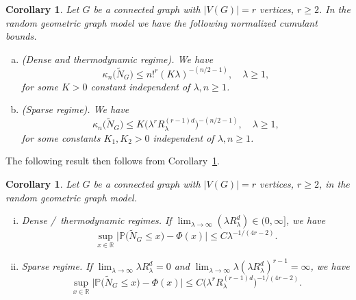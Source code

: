 \documentclass[12pt]{article}
\newtheorem{corollary}[prop]{Corollary}
\def\real{{\mathord{\mathbb R}}}
\def\P{\mathbb{P}}
\numberwithin{equation}{section}
\begin{document}
\begin{corollary}
    \label{thm8-0}
 Let $G$ be a connected graph with $|V(G)|=r$ vertices, $r\geq 2$.
 In the random geometric graph model we have the following
 normalized cumulant bounds.  
 \begin{enumerate}[a)]
 \item (Dense and thermodynamic regime). 
   We have
   \begin{equation}
     \kappa_n\big(\widetilde{N}_G\big) \leq n!^r ( K \lambda )^{-(n/2-1)}, 
     \quad \lambda \geq 1,
   \end{equation}
for some $K>0$ constant independent of $\lambda , n\geq 1$. 
  \item (Sparse regime). 
   We have
   \begin{equation}
     \kappa_n\big(\widetilde{N}_G\big)\leq K \big(
      \lambda^r R_\lambda^{(r-1)d} \big)^{-(n/2-1)},
      \quad \lambda \geq 1,
   \end{equation}
for some constants $K_1, K_2 > 0$ independent of $\lambda , n\geq 1$. 
 \end{enumerate}
\end{corollary}
 The following result then follows from Corollary~\ref{thm8-0}. 
\begin{corollary}
  \label{jdkj10}
  Let $G$ be a connected graph with $|V(G)|=r$ vertices, $r\geq 2$,
  in the random geometric graph model.
  \begin{enumerate}[i)]
    \item 
    Dense \!\! \slash \ thermodynamic regimes. 
  If $\lim_{\lambda\to\infty} (\lambda R_\lambda^d) \in (0,\infty]$, 
 we have
\begin{equation}
\nonumber
  \sup_{x\in \real}
\big| \P \big( \widetilde{N}_G \leq x \big) - \Phi(x) \big| \leq
C
\lambda^{-1/ ( 4r - 2) }.
\end{equation}
\item
  Sparse regime.
  If $\lim_{\lambda\to\infty} \lambda R_\lambda^d = 0$ and
  $\lim_{\lambda\to\infty} \lambda(\lambda R_\lambda^d)^{r-1} = \infty$,
  we have 
\begin{equation}
\sup_{x\in \real}
\big| \P \big( \widetilde{N}_G \leq x \big) - \Phi(x) \big| \leq
C
\big(\lambda^r R_\lambda^{(r-1)d}\big)^{-1/ ( 4r - 2) }.
\end{equation}
\end{enumerate}
\end{corollary}
\end{document}
